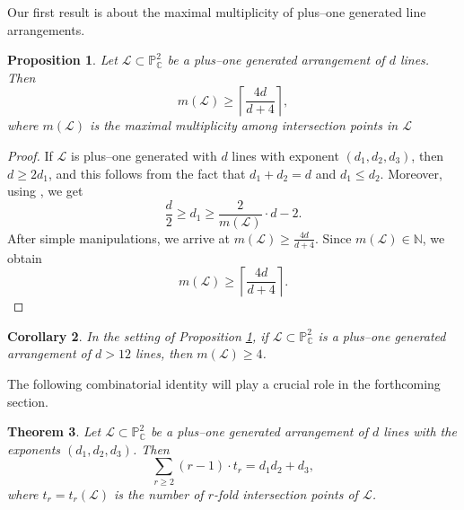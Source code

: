 \documentclass[12pt]{article}
\theoremstyle{plain}
\newtheorem{thm}{Theorem}[section]
\newtheorem{proposition}[thm]{Proposition}
\newtheorem{corollary}[thm]{Corollary}
\theoremstyle{definition}
\begin{document}
Our first result is about the maximal multiplicity of plus--one generated line arrangements.
\begin{proposition}
\label{mm}
    Let $\mathcal{L} \subset \mathbb{P}^{2}_{\mathbb{C}}$ be a plus--one generated arrangement of $d$ lines. Then
    $$m(\mathcal{L})\geq \left\lceil \frac{4d}{d+4} \right\rceil,$$
    where $m(\mathcal{L})$ is the maximal multiplicity among intersection points in $\mathcal{L}$
\end{proposition}

\begin{proof}
If $\mathcal{L}$ is plus--one generated with $d$ lines with exponent $
(d_{1}, d_{2}, d_{3})$, then $d\geq 2d_1$, and this follows from the fact that $d_{1}+d_{2}=d$ and $d_{1} \leq d_{2}$. Moreover, using \cite[Theorem 2.1]{Dimca2}, we get $$\frac{d}{2} \geq d_1 \geq \frac{2}{m(\mathcal{L})}\cdot d-2.$$
After simple manipulations, we arrive at
$m(\mathcal{L})\geq\frac{4d}{d+4}$.
Since $m(\mathcal{L})\in\mathbb{N}$, we obtain 
$$m(\mathcal{L})\geq\left\lceil\frac{4d}{d+4}\right\rceil.$$
\end{proof}
\begin{corollary}
\label{max}
In the setting of Proposition \ref{mm}, if $\mathcal{L} \subset \mathbb{P}^{2}_{\mathbb{C}}$ is a plus--one generated arrangement of $d>12$ lines, then $m(\mathcal{L}) \geq 4$.
\end{corollary}

The following combinatorial identity will play a crucial role in the forthcoming section.
\begin{thm}
\label{comeq}
     Let $\mathcal{L} \subset \mathbb{P}^{2}_{\mathbb{C}}$ be a plus--one generated arrangement of $d$ lines with the exponents $(d_1, d_2, d_3)$. Then
     $$\sum_{r\geq2}(r-1)\cdot t_r=d_1 d_2+d_3,$$
where $t_r = t_{r}(\mathcal{L})$ is the number of $r$-fold intersection points of $\mathcal{L}$.
\end{thm}
\end{document}
